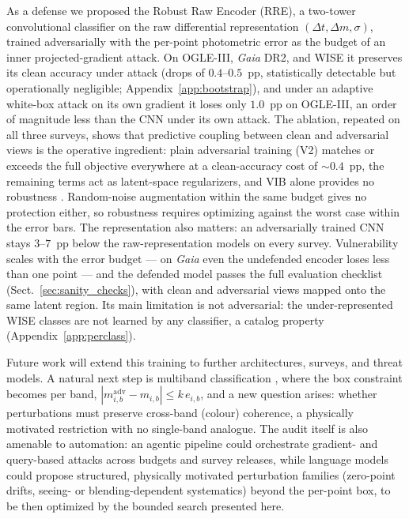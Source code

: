 \documentclass{aa}
\begin{document}
As a defense we proposed the Robust Raw Encoder (RRE), a two-tower
convolutional classifier on the raw differential representation $(\Delta
t, \Delta m, \sigma)$, trained adversarially with the per-point photometric
error as the budget of an inner projected-gradient attack. On OGLE-III,
\textit{Gaia} DR2, and WISE it preserves its clean accuracy under attack
(drops of $0.4$--$0.5$~pp, statistically detectable but operationally
negligible; Appendix~\ref{app:bootstrap}), and under an adaptive
white-box attack on its own gradient \citep{carlini2019evaluating} it
loses only $1.0$~pp on OGLE-III, an order of magnitude less than the CNN
under its own attack. The ablation, repeated on all three surveys, shows
that predictive coupling between clean and adversarial views is the
operative ingredient: plain adversarial training (V2) matches or exceeds
the full objective everywhere at a clean-accuracy cost of ${\sim}0.4$~pp,
the remaining terms act as latent-space regularizers, and VIB alone
provides no robustness \citep[corroborating][]{korshunova2021closer}.
Random-noise augmentation within the same budget gives no protection
either, so robustness requires optimizing against the worst case within
the error bars. The representation also matters: an adversarially trained
CNN stays $3$--$7$~pp below the raw-representation models on every
survey. Vulnerability scales with the error budget --- on \textit{Gaia}
even the undefended encoder loses less than one point --- and the defended
model passes the full evaluation checklist (Sect.~\ref{sec:sanity_checks}),
with clean and adversarial views mapped onto the same latent region. Its
main limitation is not adversarial: the under-represented WISE classes are
not learned by any classifier, a catalog property
(Appendix~\ref{app:perclass}).

Future work will extend this
training to further architectures, surveys, and threat models. A natural next step is multiband classification
\citep[e.g.][]{cabrera2024atat}, where the box constraint becomes per band,
$|m^{\mathrm{adv}}_{i,b}-m_{i,b}|\le k\,e_{i,b}$, and a new question
arises: whether perturbations must preserve cross-band (colour) coherence,
a physically motivated restriction with no single-band analogue. The audit
itself is also amenable to automation: an agentic pipeline could
orchestrate gradient- and query-based attacks across budgets and survey
releases, while language models could propose structured, physically
motivated perturbation families (zero-point drifts, seeing- or
blending-dependent systematics) beyond the per-point box, to be then
optimized by the bounded search presented here.
\end{document}
